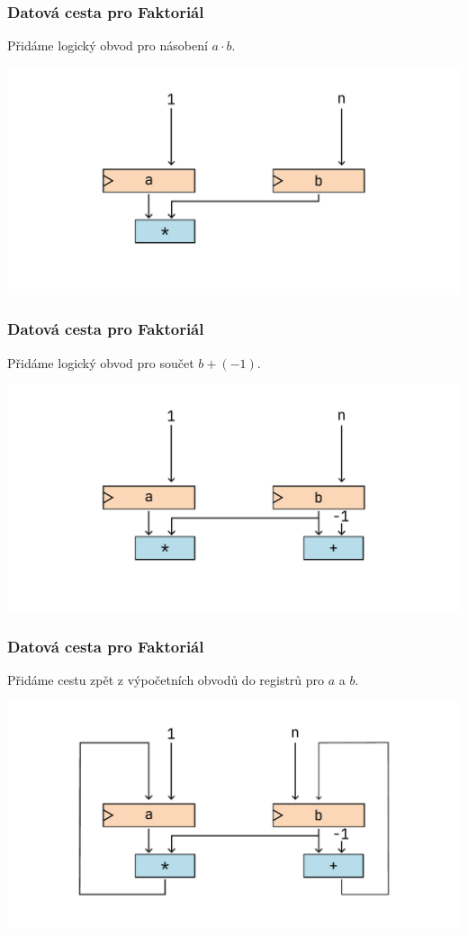 \documentclass[aspectratio=169,11pt,svgnames]{beamer}
\begin{document}
\begin{frame}
 \frametitle{Datová cesta pro Faktoriál}
 Přidáme logický obvod pro násobení $a \cdot b$.
 \begin{center}
  \includegraphics[width=.75\textwidth]{factorial-circuit-3.pdf}
 \end{center}
\end{frame}

\begin{frame}
 \frametitle{Datová cesta pro Faktoriál}
 Přidáme logický obvod pro součet $b + (-1)$.
 \begin{center}
  \includegraphics[width=.75\textwidth]{factorial-circuit-4.pdf}
 \end{center}
\end{frame}

\begin{frame}
 \frametitle{Datová cesta pro Faktoriál}
 Přidáme cestu zpět z výpočetních obvodů do registrů pro $a$ a $b$.
 \begin{center}
  \includegraphics[width=.75\textwidth]{factorial-circuit-5.pdf}
 \end{center}
\end{frame}
\end{document}
